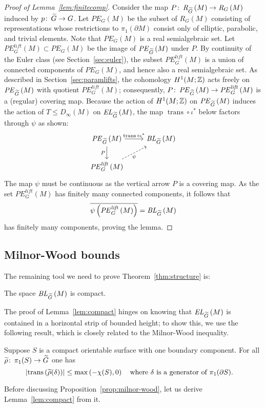 \documentclass[tikz, sepfignums, defaultenums]{nmd/article}
\newcommand{\G}{G}
\newcommand{\RG}[1]{\mathit{R}_{G}\left(#1\right)}
\newcommand{\RGPE}[1]{\mathit{PE}_{G}\left(#1\right)}
\newcommand{\RGlift}[1]{\mathit{PE}^{\mathit{lift}}_{G}\left(#1\right)}
\newcommand{\RGtil}[1]{\mathit{R}_{\Gtil}\left(#1\right)}
\newcommand{\RGtilPE}[1]{\mathit{PE}_{\Gtil}\left(#1\right)}
\newcommand{\inc}{\iota}
\DeclareMathOperator{\trans}{trans}
\newcommand{\TEL}[1]{\mathit{EL}_\Gtil\left(#1\right)}
\newcommand{\SymTEL}[1]{D_\infty\left(#1\right)}
\newcommand{\TELquo}[1]{\mathit{BL}_\Gtil\left(#1\right)}
\newcommand{\abstrans}[1]{\abs{\trans\left(#1\right)}}
\begin{document}
\begin{proof}[Proof of Lemma~\ref{lem:finitecomp}]
Consider the map $P \maps \RGtil{M} \to \RG{M}$ induced by
$p \maps \Gtil \to \G$.  Let $\RGPE{M}$ be the subset of $\RG{M}$
consisting of representations whose restrictions to
$\pi_1(\partial M)$ consist only of elliptic, parabolic, and trivial
elements.  Note that $\RGPE{M}$ is a real semialgebraic set.  Let
$\RGlift{M} \subset \RGPE{M}$ be the image of $\RGtilPE{M}$ under $P$.
By continuity of the Euler class (see Section~\ref{sec:euler}), the
subset $\RGlift{M}$ is a union of connected components of $\RGPE{M}$,
and hence also a real semialgebraic set. As described in
Section~\ref{sec:paramlifts}, the cohomology $H^1(M; {\mathbb Z})$ acts freely
on $\RGtilPE{M}$ with quotient $\RGlift{M}$; consequently,
$P \maps \RGtilPE{M} \to \RGlift{M}$ is a (regular) covering map.
Because the action of $H^1(M; {\mathbb Z})$ on $\RGtilPE{M}$ induces the action
of $T \leq \SymTEL{M}$ on $\TEL{M}$, the map $\trans \circ \inc^*$
below factors through $\psi$ as shown:
\[
\begin{tikzcd}
 \RGtilPE{M} \arrow{r}{\trans \circ \inc^*} \arrow{d}[left]{P} & \TELquo{M} \\ 
 \RGlift{M} \arrow[dashrightarrow]{ru}[below]{\psi} & 
\end{tikzcd}
\]
The map $\psi$ must be continuous as the vertical arrow $P$ is a
covering map.  As the set $\RGlift{M}$ has finitely many connected
components, it follows that
\[
\overline{\psi\left(\RGlift{M}\right)} = \TELquo{M}
\]
has finitely many components, proving the lemma.
\end{proof}

\subsection{Milnor-Wood bounds}  
\label{sec:milnor-wood} 

The remaining tool we need to prove Theorem~\ref{thm:structure} is:
\begin{lemma}\label{lem:compact}
  The space $\TELquo{M}$ is compact.
\end{lemma}
The proof of Lemma~\ref{lem:compact} hinges on knowing that $\TEL{M}$
is contained in a horizontal strip of bounded height; to show this, we
use the following result, which is closely related to the Milnor-Wood
inequality.

\begin{proposition}\label{prop:milnor-wood}
  Suppose $S$ is a compact orientable surface with one boundary
  component.  For all $\rhotil \maps \pi_1(S) \to \Gtil$ one has 
  \[
  \abstrans{\rhotil(\delta)}  \leq \max\left(-\chi(S), 0\right) \mtext{where
    $\delta$ is a generator of $\pi_1(\partial S)$.}
  \] 
\end{proposition}
Before discussing Proposition~\ref{prop:milnor-wood}, let us derive
Lemma~\ref{lem:compact} from it.  
\end{document}
